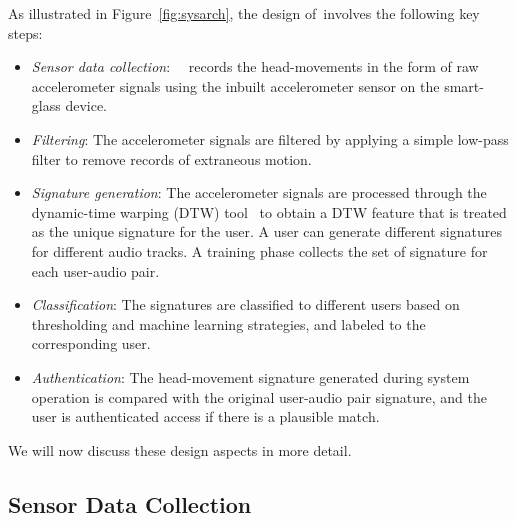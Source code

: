 As illustrated in Figure~\ref{fig:sysarch}, the design of~\systemname involves the following key steps:
\begin{itemize}
\item {\em Sensor data collection}: ~\systemname~records the head-movements
in the form of raw accelerometer signals using the inbuilt accelerometer
sensor on the smart-glass device.
\item {\em Filtering}: The accelerometer signals are filtered by applying
a simple low-pass filter to remove records of extraneous motion.
\item {\em Signature generation}: The accelerometer signals are
processed through the dynamic-time warping (DTW) tool~\cite{dtw} to obtain a
DTW
feature that is treated as the unique signature for the user.
A user can generate different signatures for different audio tracks. A
training phase collects the set of signature for each user-audio pair.
\item {\em Classification}: The signatures are classified
to different users based on thresholding and machine learning strategies, and
labeled to the corresponding user.
\item {\em Authentication}: The head-movement signature generated
during system operation is compared with the original user-audio pair
signature, and the user is authenticated access if there is a plausible match.
\end{itemize}

We will now discuss these design aspects in more detail.

\subsection{Sensor Data Collection}

